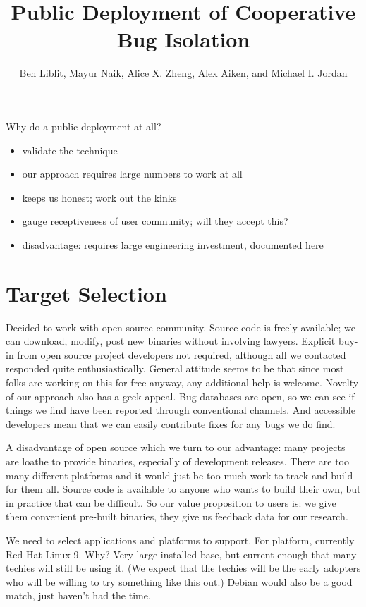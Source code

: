 \documentclass[times,10pt,twocolumn]{article}
\begin{document}
\title{Public Deployment of Cooperative Bug Isolation}

\author{Ben Liblit, Mayur Naik, Alice X. Zheng, Alex Aiken, and Michael I. Jordan}

\maketitle

Why do a public deployment at all?

\begin{itemize}
\item validate the technique
\item our approach requires large numbers to work at all
\item keeps us honest; work out the kinks
\item gauge receptiveness of user community; will they accept this?
\item disadvantage: requires large engineering investment, documented here
\end{itemize}

\section{Target Selection}

Decided to work with open source community.  Source code is freely
available; we can download, modify, post new binaries without
involving lawyers.  Explicit buy-in from open source project
developers not required, although all we contacted responded quite
enthusiastically.  General attitude seems to be that since most folks
are working on this for free anyway, any additional help is welcome.
Novelty of our approach also has a geek appeal.  Bug databases are
open, so we can see if things we find have been reported through
conventional channels.  And accessible developers mean that we can
easily contribute fixes for any bugs we do find.

A disadvantage of open source which we turn to our advantage: many
projects are loathe to provide binaries, especially of development
releases.  There are too many different platforms and it would just be
too much work to track and build for them all.  Source code is
available to anyone who wants to build their own, but in practice that
can be difficult.  So our value proposition to users is: we give them
convenient pre-built binaries, they give us feedback data for our
research.

We need to select applications and platforms to support.  For
platform, currently Red Hat Linux 9.  Why?  Very large installed base,
but current enough that many techies will still be using it.  (We
expect that the techies will be the early adopters who will be willing
to try something like this out.)  Debian would also be a good match,
just haven't had the time.
\end{document}
